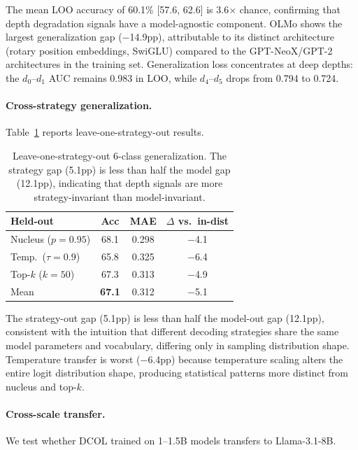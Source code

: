 \documentclass[11pt,a4paper]{article}
\newcommand{\ours}{DCOL}
\begin{document}
The mean LOO accuracy of 60.1\% [57.6, 62.6] is 3.6$\times$ chance, confirming that depth degradation signals have a model-agnostic component.
OLMo shows the largest generalization gap ($-$14.9pp), attributable to its distinct architecture (rotary position embeddings, SwiGLU) compared to the GPT-NeoX/GPT-2 architectures in the training set.
Generalization loss concentrates at deep depths: the $d_{0}$--$d_{1}$ AUC remains 0.983 in LOO, while $d_{4}$--$d_{5}$ drops from 0.794 to 0.724.

\paragraph{Cross-strategy generalization.}
Table~\ref{tab:loo_strategy} reports leave-one-strategy-out results.

\begin{table}[t]
\centering
\small
\begin{tabular}{lccc}
\toprule
\textbf{Held-out} & \textbf{Acc} & \textbf{MAE} & \textbf{$\Delta$ vs.\ in-dist} \\
\midrule
Nucleus ($p{=}0.95$) & 68.1 & 0.298 & $-$4.1 \\
Temp.\ ($\tau{=}0.9$)& 65.8 & 0.325 & $-$6.4 \\
Top-$k$ ($k{=}50$)   & 67.3 & 0.313 & $-$4.9 \\
\midrule
Mean                  & \textbf{67.1} & 0.312 & $-$5.1 \\
\bottomrule
\end{tabular}
\caption{Leave-one-strategy-out 6-class generalization. The strategy gap (5.1pp) is less than half the model gap (12.1pp), indicating that depth signals are more strategy-invariant than model-invariant.}
\label{tab:loo_strategy}
\end{table}

The strategy-out gap (5.1pp) is less than half the model-out gap (12.1pp), consistent with the intuition that different decoding strategies share the same model parameters and vocabulary, differing only in sampling distribution shape. Temperature transfer is worst ($-$6.4pp) because temperature scaling alters the entire logit distribution shape, producing statistical patterns more distinct from nucleus and top-$k$.

\paragraph{Cross-scale transfer.}
We test whether \ours{} trained on 1--1.5B models transfers to Llama-3.1-8B.
\end{document}
